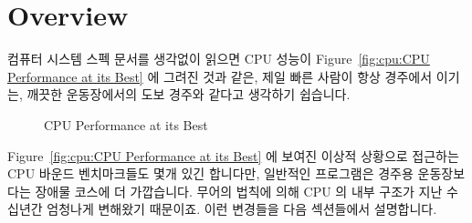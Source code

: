 
\section{Overview}
\label{sec:cpu:Overview}

컴퓨터 시스템 스펙 문서를 생각없이 읽으면 CPU 성능이 Figure~\ref{fig:cpu:CPU
Performance at its Best} 에 그려진 것과 같은, 제일 빠른 사람이 항상 경주에서
이기는, 깨끗한 운동장에서의 도보 경주와 같다고 생각하기 쉽습니다.

\begin{figure}[htb]
\begin{center}
\end{center}
\caption{CPU Performance at its Best}
\end{figure}

Figure~\ref{fig:cpu:CPU Performance at its Best} 에 보여진 이상적 상황으로
접근하는 CPU 바운드 벤치마크들도 몇개 있긴 합니다만, 일반적인 프로그램은 경주용
운동장보다는 장애물 코스에 더 가깝습니다.
무어의 법칙에 의해 CPU 의 내부 구조가 지난 수십년간 엄청나게 변해왔기 때문이죠.
이런 변경들을 다음 섹션들에서 설명합니다.


